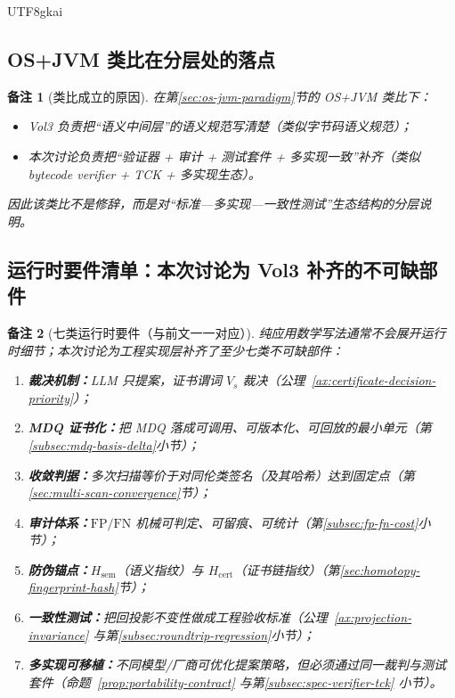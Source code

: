 \documentclass[12pt]{article}
\newtheorem{remark}{备注}[section]
\begin{document}
\begin{CJK*}{UTF8}{gkai}
\subsection{OS+JVM 类比在分层处的落点}
\label{subsec:osjvm-layering}

\begin{remark}[类比成立的原因]
在第\ref{sec:os-jvm-paradigm}节的 OS+JVM 类比下：
\begin{itemize}
  \item Vol3 负责把“语义中间层”的语义规范写清楚（类似字节码语义规范）；
  \item 本次讨论负责把“验证器 + 审计 + 测试套件 + 多实现一致”补齐（类似 bytecode verifier + TCK + 多实现生态）。
\end{itemize}
因此该类比不是修辞，而是对“标准—多实现—一致性测试”生态结构的分层说明。
\end{remark}

\subsection{运行时要件清单：本次讨论为 Vol3 补齐的不可缺部件}
\label{subsec:runtime-requirements}

\begin{remark}[七类运行时要件（与前文一一对应）]
纯应用数学写法通常不会展开运行时细节；本次讨论为工程实现层补齐了至少七类不可缺部件：
\begin{enumerate}
  \item \textbf{裁决机制：}LLM 只提案，证书谓词 $V_s$ 裁决（公理~\ref{ax:certificate-decision-priority}）；
  \item \textbf{MDQ 证书化：}把 MDQ 落成可调用、可版本化、可回放的最小单元（第\ref{subsec:mdq-basis-delta}小节）；
  \item \textbf{收敛判据：}多次扫描等价于对同伦类签名（及其哈希）达到固定点（第\ref{sec:multi-scan-convergence}节）；
  \item \textbf{审计体系：}$\mathrm{FP}/\mathrm{FN}$ 机械可判定、可留痕、可统计（第\ref{subsec:fp-fn-cost}小节）；
  \item \textbf{防伪锚点：}$H_{\mathrm{sem}}$（语义指纹）与 $H_{\mathrm{cert}}$（证书链指纹）（第\ref{sec:homotopy-fingerprint-hash}节）；
  \item \textbf{一致性测试：}把回投影不变性做成工程验收标准（公理~\ref{ax:projection-invariance} 与第\ref{subsec:roundtrip-regression}小节）；
  \item \textbf{多实现可移植：}不同模型/厂商可优化提案策略，但必须通过同一裁判与测试套件（命题~\ref{prop:portability-contract} 与第\ref{subsec:spec-verifier-tck}
    小节）。
\end{enumerate}
\end{remark}


\end{CJK*}
\end{document}

